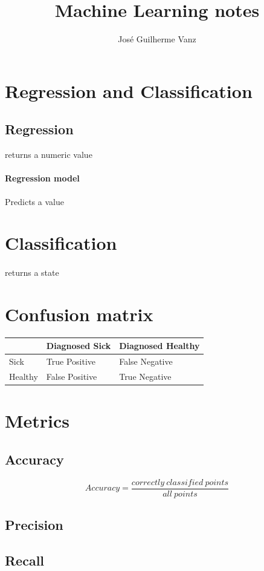\documentclass[]{article}
\title{Machine Learning notes}
\author{José Guilherme Vanz}
\begin{document}
\maketitle


\section{Regression and Classification}
\subsection{Regression} returns a numeric value 
\paragraph{Regression model} Predicts a value
\section{Classification} 
\paragraph{} returns a state

\section{Confusion matrix}
\begin{center}
	\begin{tabular}{| l | l | l |}
		\hline
		 & Diagnosed Sick & Diagnosed Healthy \\ \hline
		Sick & True Positive & False Negative \\ \hline
		Healthy & False Positive & True Negative \\ \hline
	\end{tabular}
\end{center}

\section{Metrics}
\subsection{Accuracy}
\[ Accuracy = \frac{correctly\ classified\ points}{all\ points} \]
\subsection{Precision}
\subsection{Recall}
\end{document}
